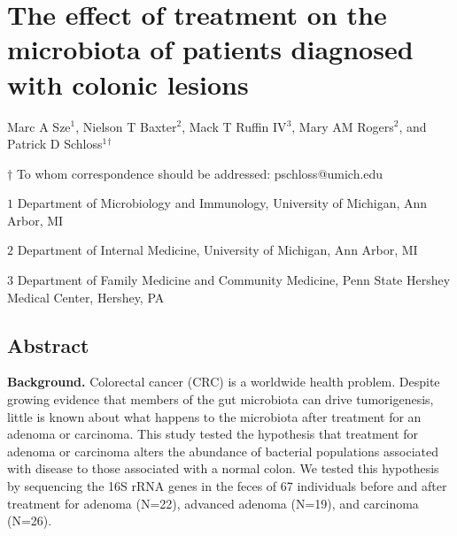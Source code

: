 \documentclass[12pt,]{article}
\title{}
\author{}
\date{}
\begin{document}
\section{The effect of treatment on the microbiota of patients diagnosed
with colonic
lesions}\label{the-effect-of-treatment-on-the-microbiota-of-patients-diagnosed-with-colonic-lesions}

\begin{center}
\vspace{25mm}

Marc A Sze${^1}$, Nielson T Baxter${^2}$, Mack T Ruffin IV${^3}$, Mary AM Rogers${^2}$, and Patrick D Schloss${^1}$${^\dagger}$

\vspace{20mm}

$\dagger$ To whom correspondence should be addressed: pschloss@umich.edu

$1$ Department of Microbiology and Immunology, University of Michigan, Ann Arbor, MI

$2$ Department of Internal Medicine, University of Michigan, Ann Arbor, MI

$3$ Department of Family Medicine and Community Medicine, Penn State Hershey Medical Center, Hershey, PA


\end{center}

\newpage

\linenumbers

\subsection{Abstract}\label{abstract}

\textbf{Background.} Colorectal cancer (CRC) is a worldwide health
problem. Despite growing evidence that members of the gut microbiota can
drive tumorigenesis, little is known about what happens to the
microbiota after treatment for an adenoma or carcinoma. This study
tested the hypothesis that treatment for adenoma or carcinoma alters the
abundance of bacterial populations associated with disease to those
associated with a normal colon. We tested this hypothesis by sequencing
the 16S rRNA genes in the feces of 67 individuals before and after
treatment for adenoma (N=22), advanced adenoma (N=19), and carcinoma
(N=26).
\end{document}
